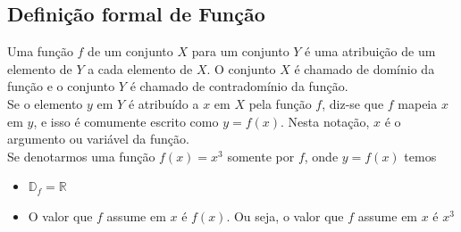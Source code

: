 \documentclass{article}
\begin{document}
\subsection{Definição formal de Função}
Uma função $f$ de um conjunto $X$ para um conjunto $Y$ é uma atribuição de um elemento de $Y$ a cada elemento de $X$. O conjunto $X$ é chamado de domínio da função e o conjunto $Y$ é chamado de contradomínio da função.
\\[2pt]
Se o elemento $y$ em $Y$ é atribuído a $x$ em $X$ pela função $f$, diz-se que $f$ mapeia $x$ em $y$, e isso é comumente escrito como $y = f(x)$. Nesta notação, $x$ é o argumento ou variável da função.
\\[5pt]
Se denotarmos uma função $f(x) = x^3$ somente por $f$, onde $y = f(x)$ temos
\begin{itemize}
    \item $\mathbb{D}_f = \mathbb{R}$

    \item O valor que $f$ assume em $x$ é $f(x)$. Ou seja, o valor que $f$ assume em $x$ é $x^3$
\end{itemize}
\end{document}
